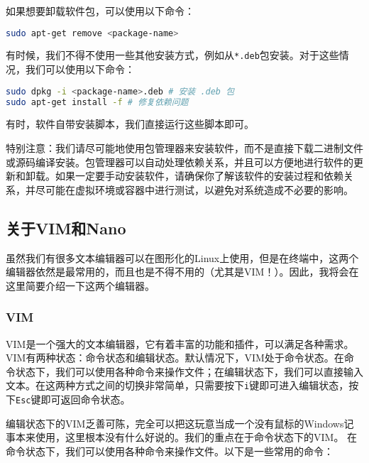 如果想要卸载软件包，可以使用以下命令：
\begin{lstlisting}[language=bash]
sudo apt-get remove <package-name>
\end{lstlisting}

有时候，我们不得不使用一些其他安装方式，例如从\texttt{*.deb}包安装。对于这些情况，我们可以使用以下命令：

\begin{lstlisting}[language=bash]
sudo dpkg -i <package-name>.deb # 安装 .deb 包
sudo apt-get install -f # 修复依赖问题
\end{lstlisting}

有时，软件自带安装脚本，我们直接运行这些脚本即可。

特别注意：我们请尽可能地使用包管理器来安装软件，而不是直接下载二进制文件或源码编译安装。包管理器可以自动处理依赖关系，并且可以方便地进行软件的更新和卸载。如果一定要手动安装软件，请确保你了解该软件的安装过程和依赖关系，并尽可能在虚拟环境或容器中进行测试，以避免对系统造成不必要的影响。

\subsection{关于VIM和Nano}

虽然我们有很多文本编辑器可以在图形化的Linux上使用，但是在终端中，这两个编辑器依然是最常用的，而且也是不得不用的（尤其是VIM！）。因此，我将会在这里简要介绍一下这两个编辑器。

\subsubsection{VIM}

VIM是一个强大的文本编辑器，它有着丰富的功能和插件，可以满足各种需求。
VIM有两种状态：命令状态和编辑状态。默认情况下，VIM处于命令状态。在命令状态下，我们可以使用各种命令来操作文件；在编辑状态下，我们可以直接输入文本。在这两种方式之间的切换非常简单，只需要按下\texttt{i}键即可进入编辑状态，按下\texttt{Esc}键即可返回命令状态。

编辑状态下的VIM乏善可陈，完全可以把这玩意当成一个没有鼠标的Windows记事本来使用，这里根本没有什么好说的。我们的重点在于命令状态下的VIM。
在命令状态下，我们可以使用各种命令来操作文件。以下是一些常用的命令：

